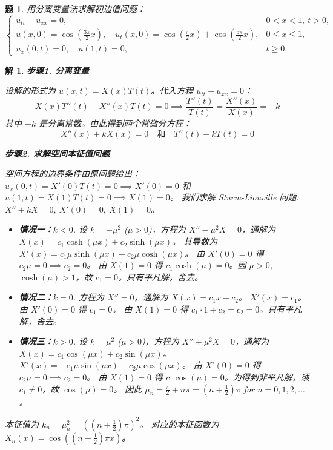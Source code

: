 \documentclass[12pt,a4paper]{article}
\newtheorem{problem}{题}
\newtheorem*{solution}{解}
\begin{document}
\begin{problem}
	用分离变量法求解初边值问题：
	\[
	\begin{cases}
		u_{tt} - u_{xx} = 0, & 0 < x < 1, \ t > 0, \\
		u(x,0) = \cos\left(\frac{3\pi}{2}x\right), \quad u_t(x,0) = \cos\left(\frac{\pi}{2}x\right) + \cos\left(\frac{5\pi}{2}x\right), & 0 \leq x \leq 1, \\
		u_x(0,t) = 0, \quad u(1,t) = 0, & t \geq 0.
	\end{cases}
	\]
\end{problem}
\hrulefill
\begin{solution}
	\textbf{步骤1. 分离变量}
	
	\noindent
	设解的形式为 $u(x,t) = X(x)T(t)$。代入方程 $u_{tt} - u_{xx} = 0$：
	\[ X(x)T''(t) - X''(x)T(t) = 0 \implies \frac{T''(t)}{T(t)} = \frac{X''(x)}{X(x)} = -k \]
	其中 $-k$ 是分离常数。由此得到两个常微分方程：
	\[ X''(x) + k X(x) = 0 \quad \text{和} \quad T''(t) + k T(t) = 0 \]
	
	\hrulefill
	
	\textbf{步骤2. 求解空间本征值问题}
	
	\noindent
	空间方程的边界条件由原问题给出：$u_x(0,t) = X'(0)T(t)=0 \implies X'(0)=0$ 和 $u(1,t)=X(1)T(t)=0 \implies X(1)=0$。
	我们求解 Sturm-Liouville 问题: $X'' + k X = 0, \ X'(0)=0, \ X(1)=0$。
	
	\begin{itemize}
		\item \textbf{情况一：$k < 0$}.
		设 $k = -\mu^2$ ($\mu>0$)，方程为 $X'' - \mu^2 X = 0$，通解为 $X(x) = c_1 \cosh(\mu x) + c_2 \sinh(\mu x)$。
		其导数为 $X'(x) = c_1\mu\sinh(\mu x) + c_2\mu\cosh(\mu x)$。
		由 $X'(0)=0$ 得 $c_2\mu=0 \implies c_2=0$。
		由 $X(1)=0$ 得 $c_1 \cosh(\mu) = 0$。因 $\mu>0$, $\cosh(\mu) > 1$，故 $c_1=0$。只有平凡解，舍去。
		
		\item \textbf{情况二：$k = 0$}.
		方程为 $X''=0$，通解为 $X(x) = c_1 x + c_2$。
		$X'(x) = c_1$。由 $X'(0)=0$ 得 $c_1=0$。
		由 $X(1)=0$ 得 $c_1 \cdot 1 + c_2 = c_2 = 0$。只有平凡解，舍去。
		
		\item \textbf{情况三：$k > 0$}.
		设 $k = \mu^2$ ($\mu>0$)，方程为 $X'' + \mu^2 X = 0$，通解为 $X(x) = c_1 \cos(\mu x) + c_2 \sin(\mu x)$。
		$X'(x) = -c_1\mu\sin(\mu x) + c_2\mu\cos(\mu x)$。
		由 $X'(0)=0$ 得 $c_2\mu=0 \implies c_2=0$。
		由 $X(1)=0$ 得 $c_1 \cos(\mu) = 0$。为得到非平凡解，须 $c_1 \neq 0$，故 $\cos(\mu)=0$。
		因此 $\mu_n = \frac{\pi}{2} + n\pi = (n+\frac{1}{2})\pi$ for $n=0, 1, 2, \dots$。
	\end{itemize}
	本征值为 $k_n = \mu_n^2 = ((n+\frac{1}{2})\pi)^2$。
	对应的本征函数为 $X_n(x) = \cos\left((n+\frac{1}{2})\pi x\right)$。
	

\end{solution}
\end{document}
